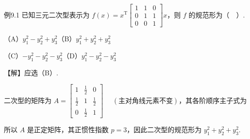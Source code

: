 \begin{fcard}{例9.1}
已知三元二次型表示为 $f(x)=x^{\mathrm T}\begin{bmatrix}1&1&0\\0&1&1\\0&0&1\end{bmatrix}x$，则 $f$ 的规范形为（$\quad$）.

（A）$y_1^2-y_2^2+y_3^2$\qquad（B）$y_1^2+y_2^2+y_3^2$

（C）$-y_1^2-y_2^2-y_3^2$\qquad（D）$y_1^2-y_2^2-y_3^2$


【解】应选（B）.

二次型的矩阵为 $A=\begin{bmatrix}1&\frac12&0\\[2pt]\frac12&1&\frac12\\[2pt]0&\frac12&1\end{bmatrix}$ $\quad(\text{主对角线元素不变})$，其各阶顺序主子式为


所以 $A$ 是正定矩阵，其正惯性指数 $p=3$，因此二次型的规范形为 $y_1^2+y_2^2+y_3^2$.
\end{fcard}

